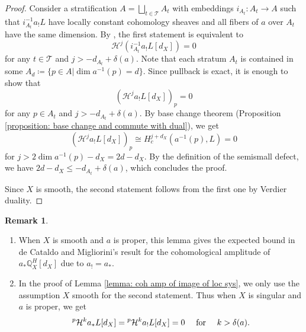\documentclass[11pt]{amsart}
\theoremstyle{definition}
\newtheorem{remark}[equation]{Remark}
\theoremstyle{plain}
\renewcommand{\H}{\mathcal H}
\newcommand{\QQ}{\mathbb Q}
\newcommand{\sT}{\mathscr T}
\begin{document}
\begin{proof}
    Consider a stratification $A = \bigsqcup_{t\in \sT} A_t$ with embeddings $i_{A_t}: A_t \to A$ such that $i^{-1}_{A_t} a_!L$ have locally constant cohomology sheaves and all fibers of $a$ over $A_t$ have the same dimension. By \cite[Proposition 8.1.22(i)]{HTT}, the first statement is equivalent to
    \[\H^j (i^{-1}_{A_t} a_! L[d_X]) = 0\]
    for any $t\in \sT$ and $j > -d_{A_t} + \delta(a)$. Note that each stratum $A_t$ is contained in some $A_d \coloneqq \{p\in A| \dim a^{-1}(p) = d\}$. Since pullback is exact, it is enough to show that 
    \[(\H^j a_! L[d_X])_p = 0\]
    for any $p\in A_t$ and $j > -d_{A_t} +\delta(a)$. By base change theorem (Proposition \ref{proposition: base change and commute with dual}), we get
    \[(\H^j a_! L[d_X])_p \cong H^{j+d_X}_c(a^{-1}(p), L) = 0\]
    for $j> 2\dim a^{-1}(p) -d_X=2d-d_X$. By the definition of the semismall defect, we have $2d - d_X \le  -d_{A_t} + \delta(a)$, which concludes the proof.

    Since $X$ is smooth, the second statement follows from the first one by Verdier duality. 
\end{proof}

\begin{remark}
    \begin{enumerate}
        \item When $X$ is smooth and $a$ is proper, this lemma gives the expected bound in de Cataldo and Migliorini's result for the cohomological amplitude of $a_* \QQ^H_X[d_X]$ due to $a_! = a_*$. 
        
        \item \label{remark: semismallness upperbound for Q^H_X} In the proof of Lemma \ref{lemma: coh amp of image of loc sys}, we only use the assumption $X$ smooth for the second statement. Thus when $X$ is singular and $a$ is proper, we get
        \[\prescript{p}{}{\H}^k a_* L[d_X] = \prescript{p}{}{\H}^k a_! L[d_X] = 0 \quad \text{ for } \quad k>\delta(a).\]
    \end{enumerate}
\end{remark}
\end{document}

